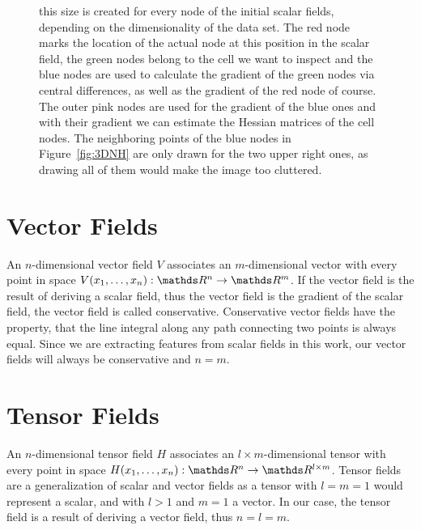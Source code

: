 \begin{figure}
{  this size is created for every node of the initial scalar fields,
  depending on the dimensionality of the data set. The red node marks
  the location of the actual node at this position in the scalar field,
  the green nodes belong to the cell we want to inspect and the blue
  nodes are used to calculate the gradient of the green nodes via
  central differences, as well as the gradient of the red node of
  course. The outer pink nodes are used for the gradient of the blue
  ones and with their gradient we can estimate the Hessian
  matrices of the cell nodes. The neighboring points of the blue nodes
  in Figure~\ref{fig:3DNH} are only drawn for the two upper right ones,
  as drawing all of them would make the image too cluttered.}
  \label{fig:NH}
\end{figure}

\section{Vector Fields}

An $n$-dimensional vector field $V$ associates an $m$-dimensional vector
with every point in space $V(x_1,\dots,x_n):\real^n \rightarrow \real^m$.
If the vector field is the result of deriving a scalar field, thus the 
vector field is the gradient of the scalar field, the vector field is
called conservative. Conservative vector fields have the property, that
the line integral along any path connecting two points is always equal.
Since we are extracting features from scalar fields in this work, our
vector fields will always be conservative and $n = m$.

\section{Tensor Fields}

An $n$-dimensional tensor field $H$ associates an $l \times
m$-dimensional tensor with every point in space $H(x_1,\dots,x_n):
\real^n \rightarrow \real^{l \times m}$. Tensor fields are a
generalization of scalar and vector fields as a tensor with $l = m = 1$
would represent a scalar, and with $l > 1$ and $m = 1$ a vector. In our
case, the tensor field is a result of deriving a vector field, thus $n =
l = m$.

